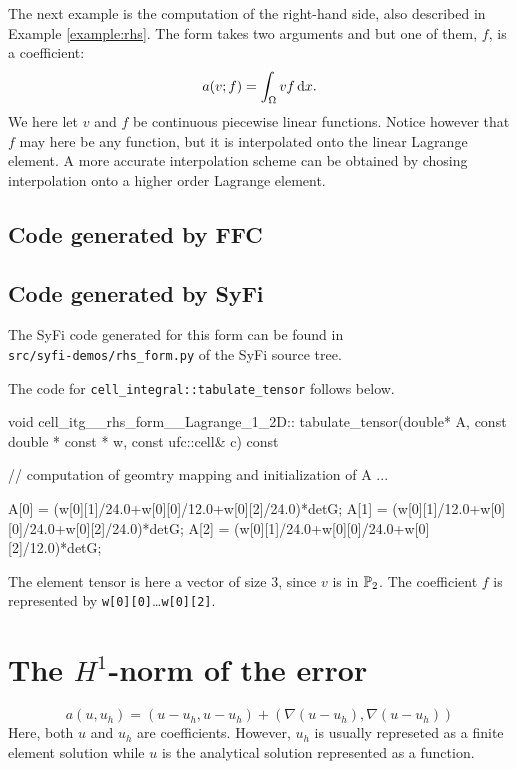 The next example is the computation of the right-hand side, also described in 
Example \ref{example:rhs}. The form takes two arguments and
but one of them, $f$, is a coefficient:
\begin{equation}
a(v; f) = \int_{\Omega} v f \dx.
\end{equation}
We here let $v$ and $f$ be continuous piecewise linear functions.
Notice however that $f$ may here be any function, 
but it is interpolated onto the linear Lagrange element. 
A more accurate interpolation scheme can be obtained 
by chosing interpolation onto a higher order Lagrange element. 

\subsection{Code generated by FFC}

\subsection{Code generated by SyFi}

The SyFi code generated for this form can be found in \\
\texttt{src/syfi-demos/rhs\_form.py} of the SyFi source tree.

The code for \texttt{cell\_integral::tabulate\_tensor} follows below.
\begin{code}
void cell_itg__rhs_form__Lagrange_1_2D::
     tabulate_tensor(double* A, const double * const * w,
                     const ufc::cell& c) const
{
  // computation of geomtry mapping and initialization of A ...
 
  A[0] = (w[0][1]/24.0+w[0][0]/12.0+w[0][2]/24.0)*detG;
  A[1] = (w[0][1]/12.0+w[0][0]/24.0+w[0][2]/24.0)*detG;
  A[2] = (w[0][1]/24.0+w[0][0]/24.0+w[0][2]/12.0)*detG;
}
\end{code}
The element tensor is here a vector of size 3, since $v$ is in $\P_2$. 
The coefficient $f$ is represented by \texttt{w[0][0]}\ldots\texttt{w[0][2]}. 

\section{The $H^1$-norm of the error}


\begin{equation}
a(u,u_h) = (u-u_h, u-u_h) + (\nabla (u-u_h), \nabla(u-u_h))    
\end{equation}
Here, both $u$ and $u_h$ are coefficients. However, $u_h$ is usually
represeted as a finite element solution while $u$ is the analytical 
solution represented as a function. 


